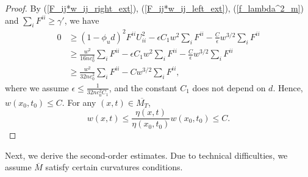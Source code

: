 \documentclass[12pt]{amsart}
\theoremstyle{definition}
\theoremstyle{remark}
\numberwithin{equation}{section}
\begin{document}
\begin{proof}
	By (\ref{F_ij*w_ij_right_ext}), (\ref{F_ij*w_ij_left_ext}), (\ref{f_lambda^2_m}) and $\sum_i F^{ii} \geq \gamma'$, we have
	\begin{equation}
	\begin{aligned}
	0 & \geq (1-\phi_u d)^2 F^{ii}  U_{ii}^2 - \epsilon C_1 w^2 \sum_i F^{ii}  - \frac{C}{\epsilon} w^{3/2}\sum_i F^{ii}\\
	& \geq \frac{w^2}{16nc_0^2}\sum_i F^{ii} - \epsilon C_1 w^2 \sum_i F^{ii}  - \frac{C}{\epsilon} w^{3/2}\sum_i F^{ii}\\
	& \geq \frac{w^2}{32nc_0^2}\sum_i F^{ii} - C w^{3/2}\sum_i F^{ii},
	\end{aligned}
	\end{equation}
	where we assume $\epsilon \leq \frac{1}{32nc_0^2 C_1}$, and the constant $C_1$ does not depend on $d$.	
	Hence, $w(x_0, t_0) \leq C$. For any $(x, t) \in \overline{M_T}$, 
	\begin{equation}
	w(x, t) \leq \frac{\eta(x, t)}{\eta(x_0, t_0)} w(x_0, t_0) \leq C.
	\end{equation}
\end{proof}


Next, we derive the second-order estimates. Due to technical difficulties, we assume $\overline{M}$ satisfy certain curvatures conditions. 
\end{document}
